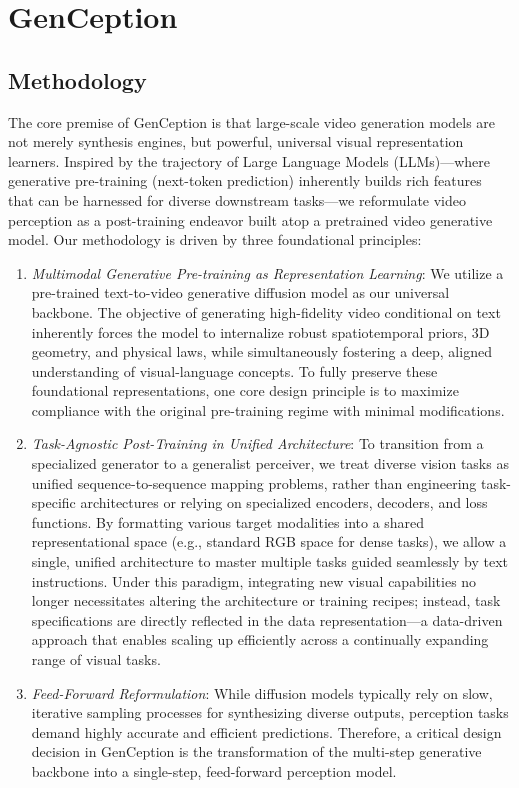 \documentclass[11pt, a4paper, logo, onecolumn]{googledeepmind}
\newcommand{\ModelName}{GenCeption\xspace}
\begin{document}
\section{\ModelName}
\subsection{Methodology}
The core premise of \ModelName is that large-scale video generation models are not merely synthesis engines, but powerful, universal visual representation learners. Inspired by the trajectory of Large Language Models (LLMs)—where generative pre-training (next-token prediction) inherently builds rich features that can be harnessed for diverse downstream tasks—we reformulate video perception as a post-training endeavor built atop a pretrained video generative model. Our methodology is driven by three foundational principles:
\begin{enumerate}[label=\arabic*)]
    \item \textit{Multimodal Generative Pre-training as Representation Learning}: We utilize a pre-trained text-to-video generative diffusion model as our universal backbone. The objective of generating high-fidelity video conditional on text inherently forces the model to internalize robust spatiotemporal priors, 3D geometry, and physical laws, while simultaneously fostering a deep, aligned understanding of visual-language concepts.
    To fully preserve these foundational representations, one core design principle is to maximize compliance with the original pre-training regime with minimal modifications.
    \item \textit{Task-Agnostic Post-Training in Unified Architecture}: To transition from a specialized generator to a generalist perceiver, we treat diverse vision tasks as unified sequence-to-sequence mapping problems, rather than engineering task-specific architectures or relying on specialized encoders, decoders, and loss functions. By formatting various target modalities into a shared representational space (e.g., standard RGB space for dense tasks), we allow a single, unified architecture to master multiple tasks guided seamlessly by text instructions.
    Under this paradigm, integrating new visual capabilities no longer necessitates altering the architecture or training recipes; instead, task specifications are directly reflected in the data representation—a data-driven approach that enables scaling up efficiently across a continually expanding range of visual tasks.
    \item \textit{Feed-Forward Reformulation}: While diffusion models typically rely on slow, iterative sampling processes for synthesizing diverse outputs, perception tasks demand highly accurate and efficient predictions. Therefore, a critical design decision in \ModelName is the transformation of the multi-step generative backbone into a single-step, feed-forward perception model.
    
\end{enumerate}
\end{document}
